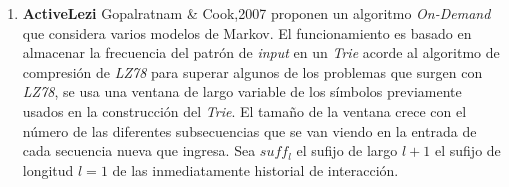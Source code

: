 \begin{enumerate}
{	%
	
	
	
	}
  \item \textbf{ActiveLezi} 
  {  
  Gopalratnam \& Cook,2007 \etal\cite{Gopalratnam2007} proponen un algoritmo \emph{On-Demand} que considera varios modelos de Markov.  
  El funcionamiento es basado en almacenar la frecuencia del patrón de \emph{input} en un \emph{Trie} acorde al algoritmo de compresión de \emph{LZ78} para superar algunos de los problemas que surgen con \emph{LZ78}, se usa una ventana de largo variable de los símbolos previamente usados en la construcción del \emph{Trie}. El tamaño de la ventana crece con el número de las diferentes subsecuencias que se van viendo en la entrada de cada secuencia nueva que ingresa.  Sea $suff_{l}$  el sufijo de largo $l+1$ el sufijo de longitud $l=1$ de las inmediatamente historial de interacción.%
 }




\end{enumerate}
